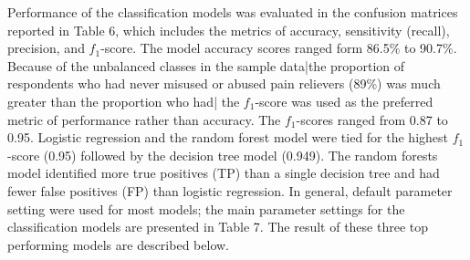 \documentclass[sigconf]{acmart}
\begin{document}
Performance of the classification models was evaluated in the confusion 
matrices reported in Table 6, which includes the metrics of accuracy, 
sensitivity (recall), precision, and $f_1$-score. The model accuracy 
scores ranged form 86.5\% to 90.7\%. Because of the unbalanced classes in 
the sample data|the proportion of respondents who had never misused or 
abused pain relievers (89\%) was much greater than the proportion who had|
the $f_1$-score was used as the preferred metric of performance rather 
than accuracy. The $f_1$-scores ranged from 0.87 to 0.95. Logistic 
regression and the random forest model were tied for the highest 
$f_1$-score (0.95) followed by the decision tree model (0.949). The 
random forests model identified more true positives (TP) than a single 
decision tree and had fewer false positives (FP) than logistic regression. 
In general, default parameter setting were used for most models; the main 
parameter settings for the classification models are presented in Table 7.
The result of these three top performing models are described below.  
 
\end{document}
